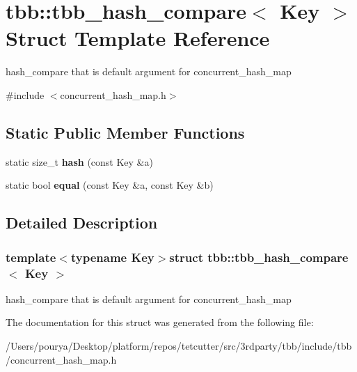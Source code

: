 \hypertarget{structtbb_1_1tbb__hash__compare}{}\section{tbb\+:\+:tbb\+\_\+hash\+\_\+compare$<$ Key $>$ Struct Template Reference}
\label{structtbb_1_1tbb__hash__compare}


hash\+\_\+compare that is default argument for concurrent\+\_\+hash\+\_\+map  




{\ttfamily \#include $<$concurrent\+\_\+hash\+\_\+map.\+h$>$}

\subsection*{Static Public Member Functions}
\begin{DoxyCompactItemize}
\item 
\hypertarget{structtbb_1_1tbb__hash__compare_a525ef96e5015680e43b8e1fecd3a2fb5}{}static size\+\_\+t {\bfseries hash} (const Key \&a)\label{structtbb_1_1tbb__hash__compare_a525ef96e5015680e43b8e1fecd3a2fb5}

\item 
\hypertarget{structtbb_1_1tbb__hash__compare_afdc33dc9b83fb3b0ead4f234eca81c95}{}static bool {\bfseries equal} (const Key \&a, const Key \&b)\label{structtbb_1_1tbb__hash__compare_afdc33dc9b83fb3b0ead4f234eca81c95}

\end{DoxyCompactItemize}


\subsection{Detailed Description}
\subsubsection*{template$<$typename Key$>$struct tbb\+::tbb\+\_\+hash\+\_\+compare$<$ Key $>$}

hash\+\_\+compare that is default argument for concurrent\+\_\+hash\+\_\+map 

The documentation for this struct was generated from the following file\+:\begin{DoxyCompactItemize}
\item 
/\+Users/pourya/\+Desktop/platform/repos/tetcutter/src/3rdparty/tbb/include/tbb/concurrent\+\_\+hash\+\_\+map.\+h\end{DoxyCompactItemize}
